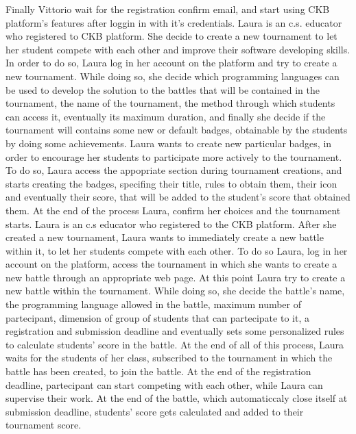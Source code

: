\documentclass{article}
\newcounter{subsubsubsection}[subsubsection]
\begin{document}
{                Finally Vittorio wait for the registration confirm email, and start using CKB platform's features after loggin in with it's credentials.
                Laura is an c.s. educator who registered to CKB platform. She decide to create a new tournament to let her student compete with each other and improve their software developing skills. In order to do so, Laura log in her account on the platform and try to create a new tournament. While doing so, she decide which programming languages can be used to develop the solution to the battles that will be contained in the tournament, the name of the tournament, the method through which students can access it, eventually its maximum duration, and finally she decide if the tournament will contains some new or default badges, obtainable by the students by doing some achievements.
                Laura wants to create new particular badges, in order to encourage her students to participate more actively to the tournament. To do so, Laura access the appopriate section during tournament creations, and starts creating the badges, specifing their title, rules to obtain them, their icon and eventually their score, that will be added to the student's score that obtained them.
                At the end of the process Laura, confirm her choices and the tournament starts.
                Laura is an c.s educator who registered to the CKB platform. After she created a new tournament, Laura wants to immediately create a new battle within it, to let her students compete with each other. To do so Laura, log in her account on the platform, access the tournament in which she wants to create a new battle through an appropriate web page. At this point Laura try to create a new battle within the tournament. While doing so, she decide the battle's name, the programming language allowed in the battle, maximum number of partecipant, dimension of group of students that can partecipate to it, a registration and submission deadline and eventually sets some personalized rules to calculate students' score in the battle.
                At the end of all of this process, Laura waits for the students of her class, subscribed to the tournament in which the battle has been created, to join the battle. At the end of the registration deadline, partecipant can start competing with each other, while Laura can supervise their work.
                At the end of the battle, which automaticcaly close itself at submission deadline, students' score gets calculated and added to their tournament score.
}
\end{document}
